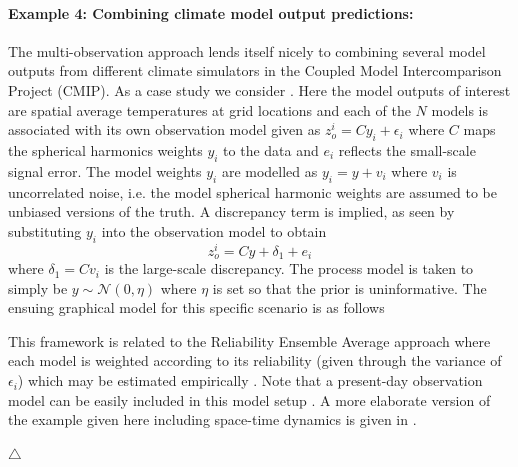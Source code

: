 \documentclass[10pt,a4paper]{article}
\newcommand\xqed[1]{%
  \leavevmode\unskip\penalty9999 \hbox{}\nobreak\hfill
  \quad\hbox{#1}}
\newcommand\demo{\xqed{$\triangle$}}
\begin{document}
\paragraph{Example 4: Combining climate model output predictions:} The multi-observation approach lends itself nicely to combining several model outputs from different climate simulators in the Coupled Model Intercomparison Project (CMIP). As a case study we consider \cite{Furrer_2007}. Here the model outputs of interest are spatial average temperatures at grid locations and each of the $N$ models is associated with its own observation model given as $z_o^i = Cy_i + \epsilon_i$ where $C$ maps the spherical harmonics weights $y_i$ to the data and $e_i$ reflects the small-scale signal error. The model weights $y_i$ are modelled as $y_i = y + v_i$ where $v_i$ is uncorrelated noise, i.e. the model spherical harmonic weights are assumed to be unbiased versions of the truth. A discrepancy term is implied, as seen by substituting $y_i$ into the observation model to obtain
\begin{equation}
z_o^i = Cy + \delta_1 + e_i
\end{equation}
\noindent where $\delta_1 = Cv_i$ is the large-scale discrepancy. The process model is taken to simply be $y \sim \mathcal{N}(0,\eta)$ where $\eta$ is set so that the prior is uninformative. The ensuing graphical model for this specific scenario is as follows
\begin{figure}[h!]
\centering
{}
\end{figure}

\noindent This framework is related to the Reliability Ensemble Average approach where each model is weighted according to its reliability (given through the variance of $\epsilon_i$) which may be estimated empirically \citep{Giorgi_2002}. Note that a present-day observation model can be easily included in this model setup \citep[see also][]{Smith_2009,Tebaldi_2007}. A more elaborate version of the example given here including space-time dynamics is given in \cite{Berliner_2008}.

\demo
\end{document}
